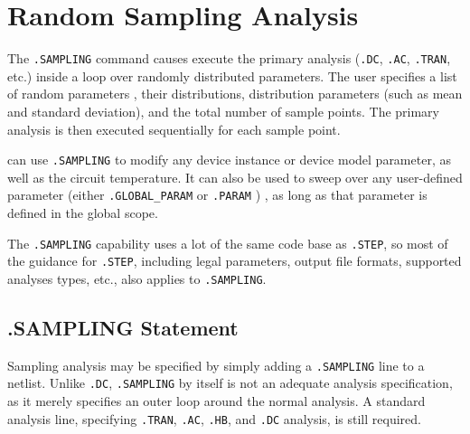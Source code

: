 

\clearpage
\section{Random Sampling Analysis}
\label{SAMPLING_Analysis}
\label{sampling_Overview}
  

The \verb|.SAMPLING| command causes \Xyce{} execute the primary analysis (\verb|.DC|,
\verb|.AC|, \verb|.TRAN|, etc.) inside a loop over randomly distributed parameters.  
The user specifies a list of random parameters , their distributions, distribution 
parameters (such as mean and standard deviation), and the total number of 
sample points.  The primary analysis is then executed sequentially for each sample point.

\Xyce{}  can use \verb|.SAMPLING| to modify any device instance or device
model parameter, as well as the circuit temperature.  It can also be used 
to sweep over any user-defined parameter (either \texttt{.GLOBAL\_PARAM} 
or \texttt{.PARAM} ) , as long as that parameter is  defined in the 
global scope.

The \verb|.SAMPLING| capability uses a lot of the same code base as \verb|.STEP|, 
so most of the guidance for \verb|.STEP|, including legal parameters, output 
file formats, supported analyses types, etc., also applies to \verb|.SAMPLING|.

\subsection{.SAMPLING Statement}
\label{sampling_statement}
Sampling analysis may be specified by simply adding a \verb|.SAMPLING| 
line to a netlist.  Unlike \verb|.DC|, \verb|.SAMPLING| by itself is not an 
adequate analysis specification, as it merely specifies an outer loop around the 
normal analysis.  A standard analysis line, specifying \verb|.TRAN|, \verb|.AC|, \verb|.HB|, 
and \verb|.DC| analysis, is still required.

